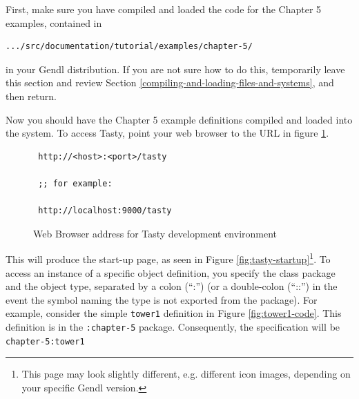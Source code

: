 \documentclass [11pt]{book}
\begin{document}
First, make sure you have compiled and loaded the code for
the Chapter 5 examples, contained in 

\begin{verbatim}.../src/documentation/tutorial/examples/chapter-5/
\end{verbatim} in your Gendl distribution. If you are not sure how to do this,
temporarily leave this section and review Section 
\ref{compiling-and-loading-files-and-systems}, and then return.



Now you should have the Chapter 5 example definitions
compiled and loaded into the system. To access Tasty, point your web
browser to the URL in figure
\ref{fig:tasty-toplevel-url}.
\begin{figure}
\begin{lrbox}{\boxedverb}
\begin{minipage}{\linewidth}

\begin{verbatim}
 http://<host>:<port>/tasty

 ;; for example:

 http://localhost:9000/tasty
\end{verbatim}
\end{minipage}
\end{lrbox}
\fbox{\usebox{\boxedverb}}

\caption{Web Browser address for Tasty development environment}

\label{fig:tasty-toplevel-url}

\end{figure}
This will produce the start-up page, as seen in Figure 
\ref{fig:tasty-startup}\footnote{This page may look slightly different, e.g. different
icon images, depending on your specific Gendl version.}. To access an instance of a specific object definition,
you specify the class package and the object type, separated by a
colon (``:'') (or a double-colon (``::'') in the event the symbol
naming the type is not exported from the package). For example,
consider the simple \texttt{tower1} definition in Figure 
\ref{fig:tower1-code}. This definition is in the \texttt{:chapter-5} package. Consequently, the specification will be \texttt{chapter-5:tower1}
\end{document}
